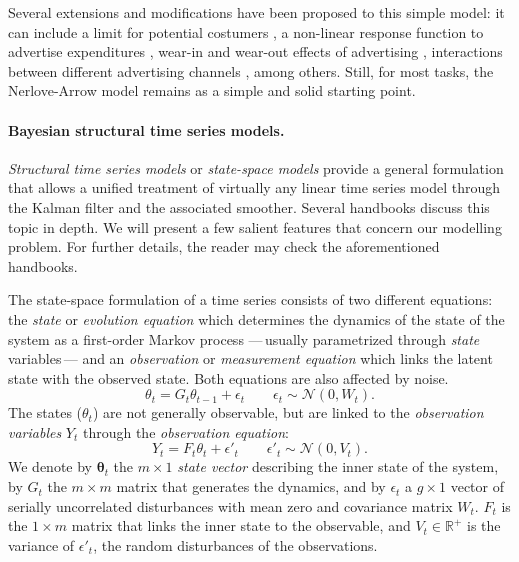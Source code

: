 Several extensions and modifications have been proposed to this simple model: it can include a limit for potential costumers \parencite{vidale1957operations}, a non-linear response function to advertise expenditures \parencite{little1975brandaid}, wear-in and wear-out effects of advertising \parencite{naik1998planning},  interactions between different advertising channels \parencite{bass2007wearout}, among others. Still, for most  tasks, the  Nerlove-Arrow model remains as a simple and solid starting point. 

\paragraph{Bayesian structural time series models.}


\emph{Structural time series models} or \emph{state-space models} provide a general formulation that  allows a unified treatment of virtually any linear time series model through the Kalman filter and the associated smoother. Several handbooks \parencite{durbin2012time, petris2009dynamic, sarkka2013bayesian, west1998bayesian} discuss this topic in depth. We will  present a few salient features that concern our modelling problem. For further details, the reader may check the aforementioned handbooks. 

The state-space formulation of a time series consists of two different equations: the \emph{state} or \emph{evolution equation} which determines the dynamics of the state of the system as a first-order Markov process ---\,usually parametrized through \emph{state} variables\,--- and an \emph{observation} or \emph{measurement  equation} which links the latent state with the observed state. Both equations are also affected by noise.
\begin{equation}\label{eq:st}
\theta_{t} = G_t \theta_{t-1} + \epsilon_t \qquad \epsilon_t \sim \mathcal{N}(0, W_t).
\end{equation}
The states ($\theta_t$) are not generally observable, but are linked to the \emph{observation variables} $Y_t$ through the \emph{observation equation}:
\begin{equation}\label{eq:obs}
Y_t = F_t \theta_t + \epsilon'_t \qquad \epsilon'_t \sim \mathcal{N}(0, V_t).
\end{equation}
We denote by $\mathbf{\theta}_t$ the $m\times1$ \emph{state vector} describing the inner state of the system, by $G_t$ the $m\times m$ matrix that generates the dynamics, and by $ \epsilon_t $ a $g\times 1$ vector of serially uncorrelated disturbances with mean zero and covariance matrix $W_t$. $F_t$ is the $1\times m$ matrix that links the inner state to the observable, and $V_t \in \mathbb{R}^+$ is the variance of $\epsilon'_t $, the random disturbances of the observations.



